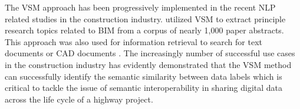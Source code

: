 \documentclass[Journal, BackFigs, DoubleSpace]{ascelike}%
\begin{document}
\par
The VSM approach has been progressively implemented in the recent NLP related studies in the construction industry.  utilized VSM to extract principle research topics related to BIM from a corpus of nearly 1,000 paper abstracts. This approach was also used for information retrieval to search for text documents \cite{lv15} or CAD documents \cite{hsu13}. The increasingly number of successful use cases in the construction industry has evidently demonstrated that the VSM method can successfully identify the semantic similarity between data labels which is critical to tackle the issue of semantic interoperability in sharing digital data across the life cycle of a highway project.
%
\end{document}
